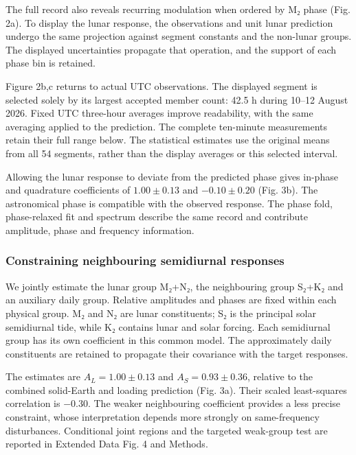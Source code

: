 \documentclass[
  12pt,
  a4paper,
]{article}
\begin{document}
The full record also reveals recurring modulation when ordered by M₂
phase (Fig. 2a). To display the lunar response, the observations and
unit lunar prediction undergo the same projection against segment
constants and the non-lunar groups. The displayed uncertainties
propagate that operation, and the support of each phase bin is retained.

Figure 2b,c returns to actual UTC observations. The displayed segment is
selected solely by its largest accepted member count: 42.5 h during
10--12 August 2026. Fixed UTC three-hour averages improve readability,
with the same averaging applied to the prediction. The complete
ten-minute measurements retain their full range below. The statistical
estimates use the original means from all 54 segments, rather than the
display averages or this selected interval.

Allowing the lunar response to deviate from the predicted phase gives
in-phase and quadrature coefficients of \(1.00\pm0.13\) and
\(-0.10\pm0.20\) (Fig. 3b). The astronomical phase is compatible with
the observed response. The phase fold, phase-relaxed fit and spectrum
describe the same record and contribute amplitude, phase and frequency
information.

\hypertarget{constraining-neighbouring-semidiurnal-responses}{%
\subsubsection{Constraining neighbouring semidiurnal
responses}\label{constraining-neighbouring-semidiurnal-responses}}

We jointly estimate the lunar group M₂+N₂, the neighbouring group S₂+K₂
and an auxiliary daily group. Relative amplitudes and phases are fixed
within each physical group. M₂ and N₂ are lunar constituents; S₂ is the
principal solar semidiurnal tide, while K₂ contains lunar and solar
forcing. Each semidiurnal group has its own coefficient in this common
model. The approximately daily constituents are retained to propagate
their covariance with the target responses.

The estimates are \(A_L=1.00\pm0.13\) and \(A_S=0.93\pm0.36\), relative
to the combined solid-Earth and loading prediction (Fig. 3a). Their
scaled least-squares correlation is −0.30. The weaker neighbouring
coefficient provides a less precise constraint, whose interpretation
depends more strongly on same-frequency disturbances. Conditional joint
regions and the targeted weak-group test are reported in Extended Data
Fig. 4 and Methods.
\end{document}
